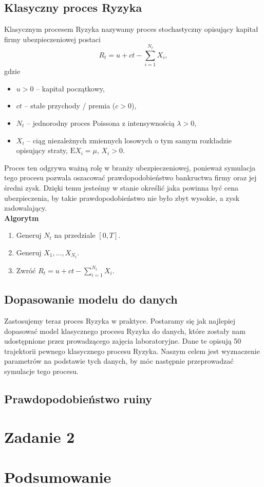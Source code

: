 \documentclass[12pt]{mwart}
\begin{document}
	\subsection{Klasyczny proces Ryzyka}
	\noindent Klasycznym procesem Ryzyka nazywamy proces stochastyczny opisujący kapitał firmy ubezpieczeniowej postaci
	$$ R_t = u + ct - \sum_{i=1}^{N_t} X_i, $$
	gdzie
	\begin{itemize}[label=\textbf{.}]
		\item $u > 0$ -- kapitał początkowy,
		\item $ct$ -- stałe przychody / premia ($c > 0$),
		\item $N_t$ -- jednorodny proces Poissona z intensywnością $\lambda > 0$,
		\item $X_i$ -- ciąg niezależnych zmiennych losowych o tym samym rozkładzie opisujący straty, $\mathrm{E}X_i = \mu$, $X_i > 0$.
	\end{itemize}
	Proces ten odgrywa ważną rolę w branży ubezpieczeniowej, ponieważ symulacja tego procesu pozwala oszacować prawdopodobieństwo bankructwa firmy oraz jej średni zysk. Dzięki temu jesteśmy w stanie określić jaka powinna być cena ubezpieczenia, by takie prawdopodobieństwo nie było zbyt wysokie, a zysk zadowalający.\\
	\noindent \textbf{Algorytm}
	\begin{enumerate}
		\item Generuj $N_t$ na przedziale $[0, T]$.
		\item Generuj $X_1, \dots, X_{N_t}$.
		\item Zwróć $R_t = u + ct - \sum\limits_{i=1}^{N_t} X_i$.
	\end{enumerate}
	
	
	\subsection{Dopasowanie modelu do danych}
	\noindent Zastosujemy teraz proces Ryzyka w praktyce. Postaramy się jak najlepiej dopasować model klasycznego procesu Ryzyka do danych, które zostały nam udostępnione przez prowadzącego zajęcia laboratoryjne. Dane te opisują 50 trajektorii pewnego klasycznego procesu Ryzyka. Naszym celem jest wyznaczenie parametrów na podstawie tych danych, by móc następnie przeprowadzać symulacje tego procesu.
	
	\subsection{Prawdopodobieństwo ruiny}
	
	
	
	
	\section{Zadanie 2}
	
	
	
	\section{Podsumowanie}
	
	
	
	\newpage
	\begin{thebibliography}{1}
		\url{}
	\end{thebibliography}
\end{document}
